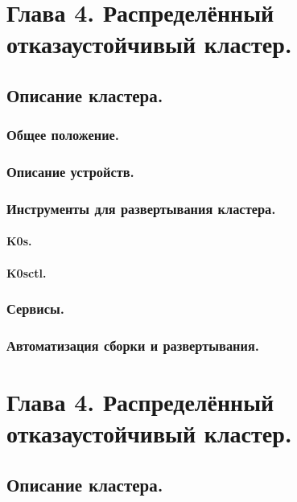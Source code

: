 \documentclass[14pt, a4paper]{extreport}
\begin{document}
\chapter{Глава 4. Распределённый отказаустойчивый кластер.}

\section{Описание кластера.}


\subsection{Общее положение.}

\subsection{Описание устройств.}

\subsection{Инструменты для развертывания кластера.}

\subsubsection{K0s.}

\subsubsection{K0sctl.}

\subsection{Сервисы.}

\subsection{Автоматизация сборки и развертывания.}



\chapter{Глава 4. Распределённый отказаустойчивый кластер.}

\section{Описание кластера.}
\end{document}
